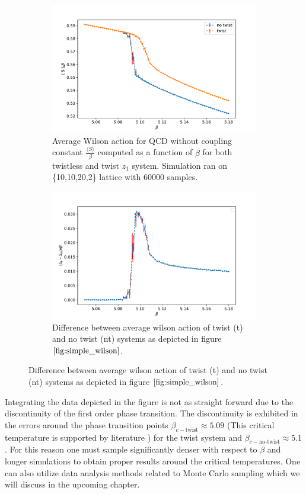 \documentclass[english,twoside,openright]{UH_TCM_MSc}
\begin{document}
\begin{figure}[htpb]
    \centering
    \begin{subfigure}[t]{\textwidth}
        \includegraphics[width=1\textwidth]{final_plots/misc/simple_wilson_action.pdf}
        \caption{Average Wilson action for QCD without coupling constant $\frac{\langle S \rangle}{\beta}$ computed as a function of $\beta$ for both twistless and twist $z_1$ system. Simulation ran on \{10,10,20,2\} lattice with 60000 samples.}
        \label{fig:simple_wilson}
    \end{subfigure}
    \begin{subfigure}[t]{\textwidth}
        \includegraphics[width=1\textwidth]{final_plots/misc/subtract_w_errors.pdf}
        \caption{Difference between average wilson action of twist (t) and no twist (nt) systems as depicted in figure $\ref{fig:simple_wilson}$.}
        \label{fig:simple_wilson_subtract}
    \end{subfigure}
\end{figure}
Integrating the data depicted in the figure is not as straight forward due to the discontinuity of the first order phase transition. The discontinuity is exhibited in the errors around the phase transition points $\beta_{c-\text{twist}} \approx 5.09$ (This critical temperature is supported by literature \cite{twist}) for the twist system and $\beta_{c-\text{no-twist}} \approx 5.1$. For this reason one must sample significantly denser with respect to $\beta$ and longer simulations to obtain proper results around the critical temperatures. One can also utilize data analysis methods related to Monte Carlo sampling which we will discuss in the upcoming chapter.
\end{document}
